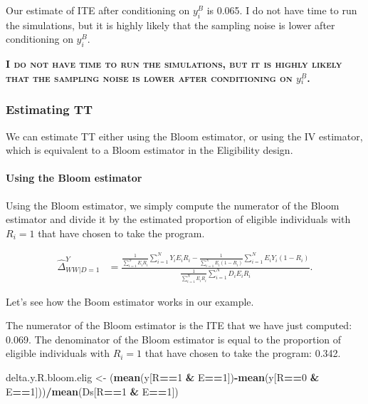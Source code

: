 \documentclass[]{book}
\newenvironment{Shaded}{\begin{snugshade}}{\end{snugshade}}
\newcommand{\KeywordTok}[1]{\textcolor[rgb]{0.13,0.29,0.53}{\textbf{#1}}}
\newcommand{\DecValTok}[1]{\textcolor[rgb]{0.00,0.00,0.81}{#1}}
\newcommand{\StringTok}[1]{\textcolor[rgb]{0.31,0.60,0.02}{#1}}
\newcommand{\OperatorTok}[1]{\textcolor[rgb]{0.81,0.36,0.00}{\textbf{#1}}}
\newcommand{\NormalTok}[1]{#1}
\let\oldparagraph\paragraph
\renewcommand{\paragraph}[1]{\oldparagraph{#1}\mbox{}}
\theoremstyle{definition}
\theoremstyle{definition}
\theoremstyle{definition}
\theoremstyle{remark}
\let\BeginKnitrBlock\begin \let\EndKnitrBlock\end
\begin{document}
Our estimate of ITE after conditioning on \(y_i^B\) is 0.065. I do not
have time to run the simulations, but it is highly likely that the
sampling noise is lower after conditioning on \(y_i^B\).

\textbf{\textsc{I do not have time to run the simulations, but it is
highly likely that the sampling noise is lower after conditioning on
\(y_i^B\).}}

\subsubsection{Estimating TT}\label{estimating-tt-1}

We can estimate TT either using the Bloom estimator, or using the IV
estimator, which is equivalent to a Bloom estimator in the Eligibility
design.

\paragraph{Using the Bloom estimator}\label{using-the-bloom-estimator}

Using the Bloom estimator, we simply compute the numerator of the Bloom
estimator and divide it by the estimated proportion of eligible
individuals with \(R_i=1\) that have chosen to take the program.

\begin{align*}
  \hat{\Delta}^Y_{WW|D=1} & = \frac{\frac{1}{\sum_{i=1}^N E_iR_i}\sum_{i=1}^N Y_iE_iR_i-\frac{1}{\sum_{i=1}^N E_i(1-R_i)}\sum_{i=1}^N E_iY_i(1-R_i)}{\frac{1}{\sum_{i=1}^N E_iR_i}\sum_{i=1}^N D_iE_iR_i}.
\end{align*}

\BeginKnitrBlock{example}
\protect\hypertarget{exm:unnamed-chunk-97}{}{\label{exm:unnamed-chunk-97}
}Let's see how the Boom estimator works in our example.
\EndKnitrBlock{example} The numerator of the Bloom estimator is the ITE
that we have just computed: 0.069. The denominator of the Bloom
estimator is equal to the proportion of eligible individuals with
\(R_i=1\) that have chosen to take the program: 0.342.

\begin{Shaded}
\begin{Highlighting}[]
\NormalTok{delta.y.R.bloom.elig <-}\StringTok{ }\NormalTok{(}\KeywordTok{mean}\NormalTok{(y[R}\OperatorTok{==}\DecValTok{1} \OperatorTok{&}\StringTok{ }\NormalTok{E}\OperatorTok{==}\DecValTok{1}\NormalTok{])}\OperatorTok{-}\KeywordTok{mean}\NormalTok{(y[R}\OperatorTok{==}\DecValTok{0} \OperatorTok{&}\StringTok{ }\NormalTok{E}\OperatorTok{==}\DecValTok{1}\NormalTok{]))}\OperatorTok{/}\KeywordTok{mean}\NormalTok{(Ds[R}\OperatorTok{==}\DecValTok{1} \OperatorTok{&}\StringTok{ }\NormalTok{E}\OperatorTok{==}\DecValTok{1}\NormalTok{])}
\end{Highlighting}
\end{Shaded}
\end{document}

